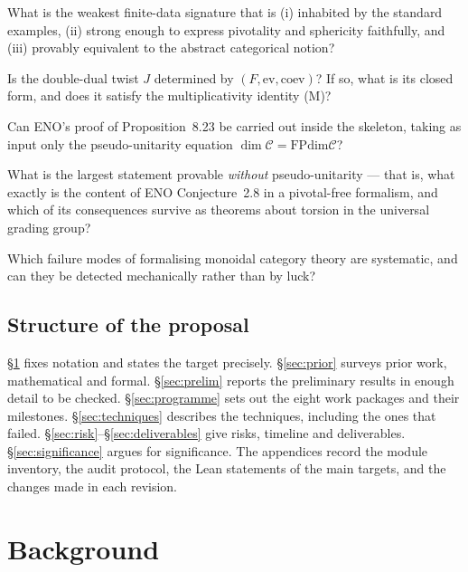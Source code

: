 \documentclass[11pt,a4paper]{article}
\theoremstyle{remark}
\newcommand{\C}{\mathcal{C}}
\newcommand{\FPdim}{\mathrm{FPdim}}
\begin{document}
\begin{description}[leftmargin=1.6em,style=nextline]
\item[Q1 (Signature).] What is the weakest finite-data signature that is (i) inhabited by the
standard examples, (ii) strong enough to express pivotality and sphericity faithfully, and
(iii) provably equivalent to the abstract categorical notion?
\item[Q2 (Twist).] Is the double-dual twist $J$ determined by $(F, \mathrm{ev}, \mathrm{coev})$?
If so, what is its closed form, and does it satisfy the multiplicativity identity (M)?
\item[Q3 (Analytic core).] Can ENO's proof of Proposition~8.23 be carried out inside the
skeleton, taking as input only the pseudo-unitarity equation $\dim \C = \FPdim \C$?
\item[Q4 (Frontier).] What is the largest statement provable \emph{without} pseudo-unitarity ---
that is, what exactly is the content of ENO Conjecture~2.8 in a pivotal-free formalism, and
which of its consequences survive as theorems about torsion in the universal grading group?
\item[Q5 (Method).] Which failure modes of formalising monoidal category theory are
systematic, and can they be detected mechanically rather than by luck?
\end{description}

\subsection{Structure of the proposal}

\S\ref{sec:background} fixes notation and states the target precisely. \S\ref{sec:prior}
surveys prior work, mathematical and formal. \S\ref{sec:prelim} reports the preliminary
results in enough detail to be checked. \S\ref{sec:programme} sets out the eight work packages
and their milestones. \S\ref{sec:techniques} describes the techniques, including the ones that
failed. \S\ref{sec:risk}--\S\ref{sec:deliverables} give risks, timeline and deliverables.
\S\ref{sec:significance} argues for significance. The appendices record the module
inventory, the audit protocol, the Lean statements of the main targets, and the changes made
in each revision.

\section{Background}\label{sec:background}
\end{document}
